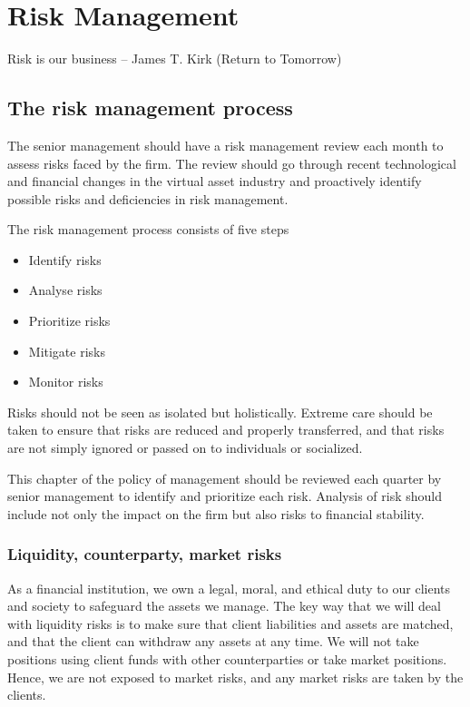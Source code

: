 \chapter{Risk Management}

Risk is our business – James T. Kirk (Return to Tomorrow)



\section{The risk management process}

The senior management should have a risk management review each month
to assess risks faced by the firm.  The review should go through
recent technological and financial changes in the virtual asset
industry and proactively identify possible risks and deficiencies in
risk management.

The risk management process consists of five steps
\begin{itemize}
\item Identify risks
\item Analyse risks
\item Prioritize risks
\item Mitigate risks
\item Monitor risks
\end{itemize}

Risks should not be seen as isolated but holistically.  Extreme care
should be taken to ensure that risks are reduced and properly
transferred, and that risks are not simply ignored or passed on to
individuals or socialized.

This chapter of the policy of management should be reviewed each quarter
by senior management to identify and prioritize each risk.
Analysis of risk should include not only the impact on the firm but also
risks to financial stability.

\subsection{Liquidity, counterparty, market risks}


As a financial institution, we own a legal, moral, and ethical duty to
our clients and society to safeguard the assets we manage.  The key
way that we will deal with liquidity risks is to make sure that client
liabilities and assets are matched, and that the client can
withdraw any assets at any time.  We will not take positions using
client funds with other counterparties or take market positions. Hence,
we are not exposed to market risks, and any market risks are taken by
the clients.

